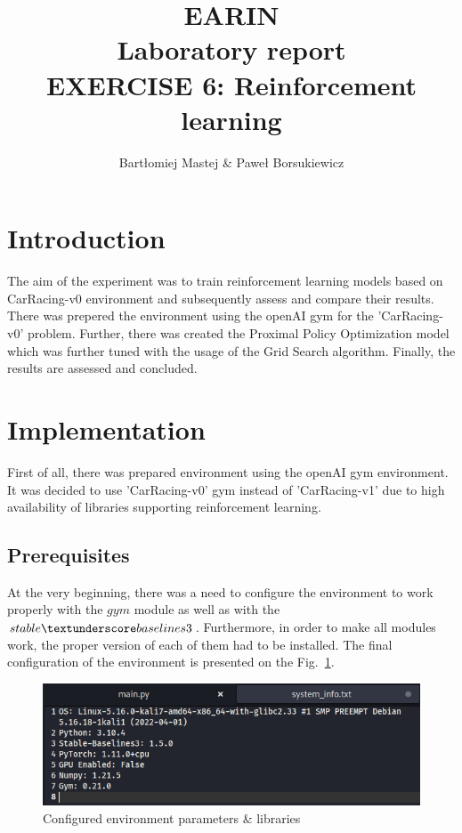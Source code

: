 \documentclass[runningheads]{llncs}
\begin{document}
%
\title{EARIN\\Laboratory report\\EXERCISE 6: Reinforcement learning}
%
\author{Bartłomiej Mastej \& Paweł Borsukiewicz}
%

%
\maketitle              %
%
%
%
%
\section{Introduction}
The aim of the experiment was to train reinforcement learning models based on CarRacing-v0 environment and subsequently assess and compare their results. There was prepered the environment using the openAI gym for the 'CarRacing-v0' problem. Further, there was created the Proximal Policy Optimization model which was further tuned with the usage of the Grid Search algorithm. Finally, the results are assessed and concluded.

\section{Implementation}
First of all, there was prepared environment using the openAI gym environment. It was decided to use 'CarRacing-v0' gym instead of 'CarRacing-v1' due to high availability of libraries supporting reinforcement learning.
\subsection{Prerequisites}
At the very beginning, there was a need to configure the environment to work properly with the $gym$ module as well as with the $stable\textunderscore baselines3$. Furthermore, in order to make all modules work, the proper version of each of them had to be installed. The final configuration of the environment is presented on the Fig.~\ref{fig:libraries}.
\begin{figure}
  \includegraphics[width=\textwidth]{Screenshots/libraries.png}
  \caption{Configured environment parameters \& libraries}
  \label{fig:libraries}
\end{figure}
\end{document}
